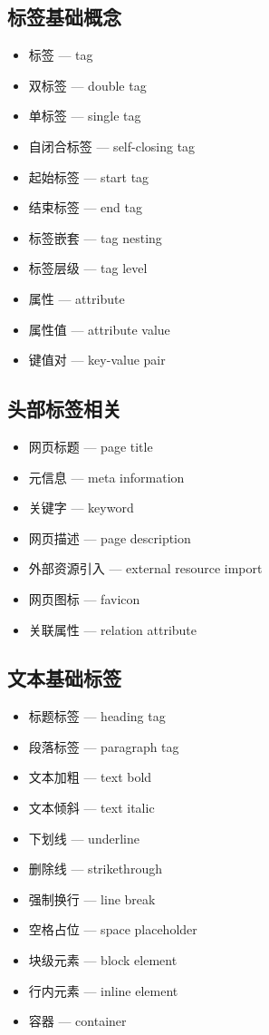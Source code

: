 \subsection{标签基础概念}
\begin{itemize}
\item 标签 — tag
\item 双标签 — double tag
\item 单标签 — single tag
\item 自闭合标签 — self-closing tag
\item 起始标签 — start tag
\item 结束标签 — end tag
\item 标签嵌套 — tag nesting
\item 标签层级 — tag level
\item 属性 — attribute
\item 属性值 — attribute value
\item 键值对 — key-value pair
\end{itemize}

\subsection{头部标签相关}
\begin{itemize}
\item 网页标题 — page title
\item 元信息 — meta information
\item 关键字 — keyword
\item 网页描述 — page description
\item 外部资源引入 — external resource import
\item 网页图标 — favicon
\item 关联属性 — relation attribute
\end{itemize}

\subsection{文本基础标签}
\begin{itemize}
\item 标题标签 — heading tag
\item 段落标签 — paragraph tag
\item 文本加粗 — text bold
\item 文本倾斜 — text italic
\item 下划线 — underline
\item 删除线 — strikethrough
\item 强制换行 — line break
\item 空格占位 — space placeholder
\item 块级元素 — block element
\item 行内元素 — inline element
\item 容器 — container
\end{itemize}

